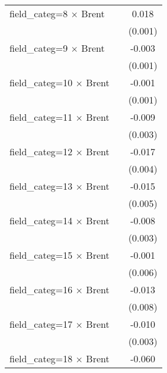 {\begin{tabular}{l*{2}{c}}
field\_categ=8 $\times$ Brent            &                     &       0.018\sym{***}\\
                                        &                     &     (0.001)         \\
field\_categ=9 $\times$ Brent            &                     &      -0.003\sym{*}  \\
                                        &                     &     (0.001)         \\
field\_categ=10 $\times$ Brent           &                     &      -0.001\sym{***}\\
                                        &                     &     (0.001)         \\
field\_categ=11 $\times$ Brent           &                     &      -0.009\sym{***}\\
                                        &                     &     (0.003)         \\
field\_categ=12 $\times$ Brent           &                     &      -0.017\sym{***}\\
                                        &                     &     (0.004)         \\
field\_categ=13 $\times$ Brent           &                     &      -0.015\sym{***}\\
                                        &                     &     (0.005)         \\
field\_categ=14 $\times$ Brent           &                     &      -0.008\sym{***}\\
                                        &                     &     (0.003)         \\
field\_categ=15 $\times$ Brent           &                     &      -0.001         \\
                                        &                     &     (0.006)         \\
field\_categ=16 $\times$ Brent           &                     &      -0.013         \\
                                        &                     &     (0.008)         \\
field\_categ=17 $\times$ Brent           &                     &      -0.010\sym{***}\\
                                        &                     &     (0.003)         \\
field\_categ=18 $\times$ Brent           &                     &      -0.060\sym{***}\\

\end{tabular}}
